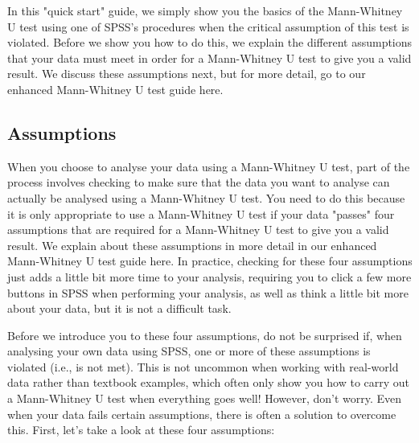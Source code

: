 \documentclass[]{article}
\begin{document}
In this "quick start" guide, we simply show you the basics of the Mann-Whitney U test using one of SPSS's procedures when the critical 
assumption of this test is violated. Before we show you how to do this, we explain the different assumptions that your data must meet 
in order for a Mann-Whitney U test to give you a valid result. We discuss these assumptions next, but for more detail, go to our enhanced Mann-Whitney U test guide here.

\subsection{Assumptions}
When you choose to analyse your data using a Mann-Whitney U test, part of the process involves checking to make sure that the data you want to analyse can actually be analysed using a Mann-Whitney U test. You need to do this because it is only appropriate to use a Mann-Whitney U test if your data "passes" four assumptions that are required for a Mann-Whitney U test to give you a valid result. We explain about these assumptions in more detail in our enhanced Mann-Whitney U test guide here. In practice, checking for these four assumptions just adds a little bit more time to your analysis, requiring you to click a few more buttons in SPSS when performing your analysis, as well as think a little bit more about your data, but it is not a difficult task.

Before we introduce you to these four assumptions, do not be surprised if, when analysing your own data using SPSS, one or more of these assumptions is violated (i.e., is not met). This is not uncommon when working with real-world data rather than textbook examples, which often only show you how to carry out a Mann-Whitney U test when everything goes well! However, don’t worry. Even when your data fails certain assumptions, there is often a solution to overcome this. First, let’s take a look at these four assumptions:
\end{document}

